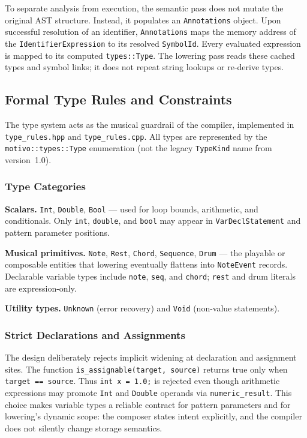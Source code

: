To separate analysis from execution, the semantic pass does not mutate the original AST structure.
Instead, it populates an \texttt{Annotations} object.
Upon successful resolution of an identifier, \texttt{Annotations} maps the memory address of the
\texttt{IdentifierExpression} to its resolved \texttt{SymbolId}.
Every evaluated expression is mapped to its computed \texttt{types::Type}.
The lowering pass reads these cached types and symbol links; it does not repeat string lookups or re-derive types.

\subsection{Formal Type Rules and Constraints}\label{detail-subsec:formal-type-rules-and-constraints}

The type system acts as the musical guardrail of the compiler, implemented in \texttt{type\_rules.hpp} and
\texttt{type\_rules.cpp}.
All types are represented by the \texttt{motivo::types::Type} enumeration (not the legacy \texttt{TypeKind} name from
version~1.0).

\subsubsection{Type Categories}

\noindent \textbf{Scalars.} \texttt{Int}, \texttt{Double}, \texttt{Bool} --- used for loop bounds, arithmetic, and
conditionals.
Only \texttt{int}, \texttt{double}, and \texttt{bool} may appear in \texttt{VarDeclStatement} and pattern parameter
positions.

\noindent \textbf{Musical primitives.} \texttt{Note}, \texttt{Rest}, \texttt{Chord}, \texttt{Sequence}, \texttt{Drum}
--- the playable or composable entities that lowering eventually flattens into \texttt{NoteEvent} records.
Declarable variable types include \texttt{note}, \texttt{seq}, and \texttt{chord}; \texttt{rest} and drum literals are
expression-only.

\noindent \textbf{Utility types.} \texttt{Unknown} (error recovery) and \texttt{Void} (non-value statements).

\subsubsection{Strict Declarations and Assignments}

The design deliberately rejects implicit widening at declaration and assignment sites.
The function \texttt{is\_assignable(target, source)} returns true only when \texttt{target == source}.
Thus \texttt{int x = 1.0;} is rejected even though arithmetic expressions may promote \texttt{Int} and
\texttt{Double} operands via \texttt{numeric\_result}.
This choice makes variable types a reliable contract for pattern parameters and for lowering's dynamic scope: the
composer states intent explicitly, and the compiler does not silently change storage semantics.

